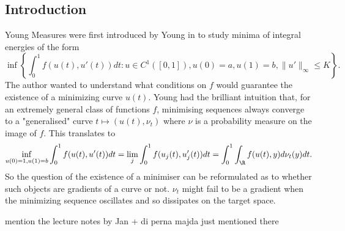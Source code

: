 \subsection{Introduction}
%
%

Young Measures were first introduced by Young in \cite{young1937generalized} to study minima of integral energies of the form
\begin{equation}
\inf\left\{ \int_0^1 f(u(t),u'(t))dt: u\in C^1([0,1]), u(0)=a, u(1)=b, \|u'\|_\infty \leq K \right\}.
\end{equation}
The author wanted to understand what conditions on $f$ would guarantee the existence of a minimizing curve $u(t)$. Young had the brilliant intuition that, for an extremely general class of functions $f$, minimising sequences always converge to a "generalised" curve $t\mapsto (u(t),\nu_t)$ where $\nu$ is a probability measure on the image of $f$. This translates to
\begin{equation}
\inf_{u(0)=1,u(1)=b} \int_0^1 f(u(t),u'(t))dt = \lim_j \int_0^1 f(u_j(t),u_j'(t))dt = \int_0^1 \int_\R f(u(t),y)d\nu_t(y) dt.
\end{equation}
So the question of the existence of a minimiser can be reformulated as to whether such objects are gradients of a curve or not. $\nu_t$ might fail to be a gradient when the minimizing sequence oscillates and so dissipates on the target space.

{\color{red} mention the lecture notes by Jan + di perna majda just mentioned there}

